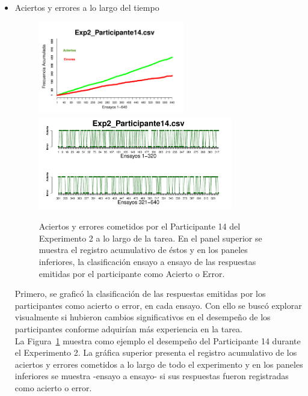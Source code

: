 \begin{itemize}
	\item Aciertos y errores a lo largo del tiempo

\begin{figure}[th]
\centering
\includegraphics[width=0.60\textwidth]{Figures/SuccessCumulative_Exp2_P14} \\
\includegraphics[width=0.8\textwidth]{Figures/Success_Exp2_P14}
\decoRule
\caption[Explorando datos individuales (ejemplo): Aciertos y errores cometidos en cada ensayo]{Aciertos y errores cometidos por el Participante 14 del Experimento 2 a lo largo de la tarea. En el panel superior se muestra el registro acumulativo de éstos y en los paneles inferiores, la clasificación ensayo a ensayo de las respuestas emitidas por el participante como Acierto o Error.}
\label{fig:Success_E2_P14}
\end{figure}

Primero, se graficó la clasificación de las respuestas emitidas por los participantes como acierto o error, en cada ensayo. Con ello se buscó explorar visualmente si hubieron cambios significativos en el desempeño de los participantes conforme adquirían más experiencia en la tarea.\\

La Figura~\ref{fig:Success_E2_P14} muestra como ejemplo el desempeño del Participante 14 durante el Experimento 2. La gráfica superior presenta el registro acumulativo de los aciertos y errores cometidos a lo largo de todo el experimento y en los paneles inferiores se muestra -ensayo a ensayo- si sus respuestas fueron registradas como acierto o error.\\


\end{itemize}
